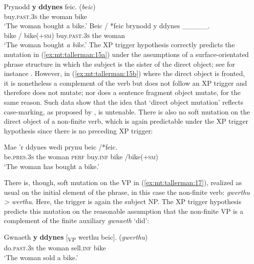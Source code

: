 \documentclass[output=paper,colorlinks,citecolor=brown]{langscibook}
\begin{document}
\ea\label{ex:mt:tallerman:15}
\ea\label{ex:mt:tallerman:15a}  
\gll Prynodd \textbf{y} \textbf{ddynes} feic. (\textit{beic})\\
buy.\textsc{past.3s} the woman bike\\
\glt ‘The woman bought a bike.’
\ex\label{ex:mt:tallerman:15b}
\gll Beic / *feic brynodd y ddynes \_\_\_\_\_.   \\
bike / bike(\textsc{+sm}) buy.{\textsc{past.3s} } the woman \\
\glt ‘The woman bought {\textit{a bike}}{.’}
\z
\z
The XP trigger hypothesis correctly predicts the mutation in (\ref{ex:mt:tallerman:15a}) under the assumptions of a surface-orientated phrase structure in which the subject is the sister of the direct object; see for instance \citet{Borsley1999}.  However, in (\ref{ex:mt:tallerman:15b}) where the direct object is fronted, it is nonetheless a complement of the verb but does not follow an XP trigger and therefore does not mutate; nor does a sentence fragment object mutate, for the same reason. Such data show that the idea that ‘direct object mutation’ reflects case-marking, as proposed by \citet{Roberts2005}, is untenable. There is also no soft mutation on the direct object of a non-finite verb, which is again predictable under the XP trigger hypothesis since there is no preceding XP trigger: 

\ea\label{ex:mt:tallerman:16}
\gll  Mae ’r ddynes wedi prynu beic /*feic.\\
be.\textsc{pres.3s} the woman \textsc{perf} buy.\textsc{inf} bike /bike(\textsc{+sm}) \\
\glt ‘The woman has bought a bike.’
\z

{There is, though, soft mutation on the VP in (\ref{ex:mt:tallerman:17}), realized as usual on the initial element of the phrase, in this case the non-finite verb:} {\textit{gwerthu > werthu}}{. Here, the trigger is again the subject NP. The XP trigger hypothesis predicts this mutation on the reasonable assumption that the non-finite VP is a complement of the finite auxiliary} {\textit{gwnaeth}}{ ‘did’:}

\ea\label{ex:mt:tallerman:17}
\gll Gwnaeth \textbf{y} \textbf{ddynes} [\textsubscript{VP} werthu beic]. (\textit{gwerthu})\\
do.\textsc{past.3s} the woman {} sell.\textsc{inf} bike\\
\glt ‘The woman sold a bike.’
\z

\end{document}
